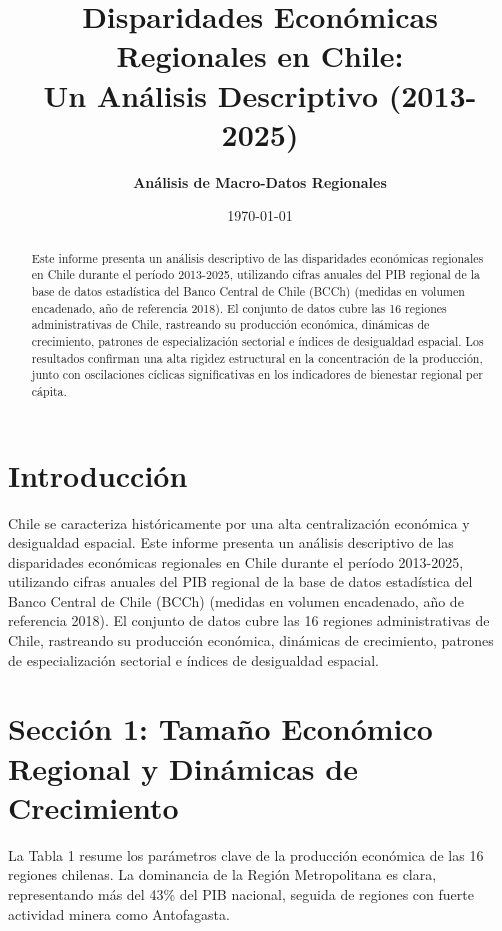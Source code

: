 \documentclass[11pt,a4paper]{article}
\title{\textbf{Disparidades Económicas Regionales en Chile:\\ Un Análisis Descriptivo (2013-2025)}}
\author{\textbf{Análisis de Macro-Datos Regionales}}
\date{\today}
\begin{document}
\maketitle

\begin{abstract}
Este informe presenta un análisis descriptivo de las disparidades económicas regionales en Chile durante el período 2013-2025, utilizando cifras anuales del PIB regional de la base de datos estadística del Banco Central de Chile (BCCh) (medidas en volumen encadenado, año de referencia 2018). El conjunto de datos cubre las 16 regiones administrativas de Chile, rastreando su producción económica, dinámicas de crecimiento, patrones de especialización sectorial e índices de desigualdad espacial. Los resultados confirman una alta rigidez estructural en la concentración de la producción, junto con oscilaciones cíclicas significativas en los indicadores de bienestar regional per cápita.
\end{abstract}

\strut

\section{Introducción}

Chile se caracteriza históricamente por una alta centralización económica y desigualdad espacial. Este informe presenta un análisis descriptivo de las disparidades económicas regionales en Chile durante el período 2013-2025, utilizando cifras anuales del PIB regional de la base de datos estadística del Banco Central de Chile (BCCh) (medidas en volumen encadenado, año de referencia 2018). El conjunto de datos cubre las 16 regiones administrativas de Chile, rastreando su producción económica, dinámicas de crecimiento, patrones de especialización sectorial e índices de desigualdad espacial.

\section{Sección 1: Tamaño Económico Regional y Dinámicas de Crecimiento}

La Tabla 1 resume los parámetros clave de la producción económica de las 16 regiones chilenas. La dominancia de la Región Metropolitana es clara, representando más del 43\% del PIB nacional, seguida de regiones con fuerte actividad minera como Antofagasta.
\end{document}
